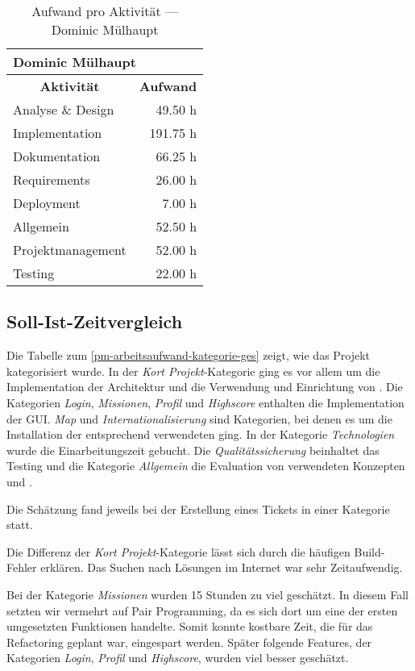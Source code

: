 \begin{table}[H]
\centering
\label{pm-arbeitsaufwand-aktivität-dm}
\begin{tabular}{|l|r|}
\hline
\multicolumn{2}{|l|}{\textbf{Dominic Mülhaupt}} \\
\hline
\multicolumn{1}{|c|}{\textbf{Aktivität}} & \multicolumn{1}{|c|}{\textbf{Aufwand}} \\
\hline
Analyse \& Design & 49.50 h \\
\hline
Implementation & 191.75 h \\
\hline
Dokumentation & 66.25 h \\
\hline
Requirements & 26.00 h \\
\hline
Deployment & 7.00 h \\
\hline
Allgemein & 52.50 h \\
\hline
Projektmanagement & 52.00 h \\
\hline
Testing & 22.00 h \\
\hline
\end{tabular}
\caption{Aufwand pro Aktivität --- Dominic Mülhaupt}
\end{table}


\subsection{Soll-Ist-Zeitvergleich}
Die Tabelle zum \ref{pm-arbeitsaufwand-kategorie-ges} zeigt, wie das Projekt kategorisiert wurde. 
In der \textit{Kort Projekt}-Kategorie ging es vor allem um die Implementation der Architektur und die Verwendung und Einrichtung von . 
Die Kategorien \textit{Login}, \textit{Missionen}, \textit{Profil} und \textit{Highscore} enthalten die Implementation der \gls{GUI}. 
\textit{Map} und \textit{Internationalisierung} sind Kategorien, bei denen es um die Installation der entsprechend verwendeten  ging. 
In der Kategorie \textit{Technologien} wurde die Einarbeitungszeit gebucht. 
Die \textit{Qualitätssicherung} beinhaltet das Testing und die Kategorie \textit{Allgemein} die Evaluation von verwendeten Konzepten und .

Die Schätzung fand jeweils bei der Erstellung eines Tickets in einer Kategorie statt. 

Die Differenz der \textit{Kort Projekt}-Kategorie lässt sich durch die häufigen Build-Fehler erklären. 
Das Suchen nach Lösungen im Internet war sehr Zeitaufwendig. 

Bei der Kategorie \textit{Missionen} wurden 15 Stunden zu viel geschätzt. 
In diesem Fall setzten wir vermehrt auf \gls{Pair Programming}, da es sich dort um eine der ersten umgesetzten Funktionen handelte.
Somit konnte kostbare Zeit, die für das Refactoring geplant war, eingespart werden. 
Später folgende Features, der Kategorien \textit{Login}, \textit{Profil} und \textit{Highscore}, wurden viel besser geschätzt.

